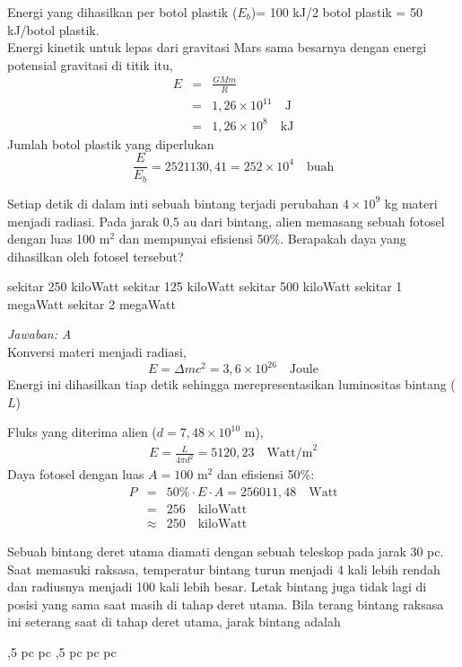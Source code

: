 \documentclass[11pt,fleqn, a4paper]{exam}
\begin{document}
\begin{questions}
Energi yang dihasilkan per botol plastik ($E_b$)= 100 kJ/2 botol plastik =  50 kJ/botol plastik.\\
Energi kinetik untuk lepas dari gravitasi Mars sama besarnya dengan energi potensial gravitasi di titik itu,
\begin{eqnarray*}
E &=& \frac{GMm}{R}\\
  &=& 1,26\times 10^{11} \quad \text{J}\\
  &=& 1,26\times 10^8 \quad \text{kJ}
\end{eqnarray*}
Jumlah botol plastik yang diperlukan 
\begin{equation*}
\frac{E}{E_b} = 2521130,41 = 252\times 10^4 \quad \text{buah}
\end{equation*}


\vspace{0.5cm}
\question Setiap detik di dalam inti sebuah bintang terjadi perubahan $4\times 10^9$ kg materi menjadi radiasi. Pada jarak 0,5 au dari bintang, alien memasang sebuah fotosel dengan luas 100 m$^2$ dan mempunyai efisiensi 50\%. Berapakah daya yang dihasilkan oleh fotosel tersebut?
\begin{choices}
\choice sekitar 250 kiloWatt
\choice sekitar 125 kiloWatt
\choice sekitar 500 kiloWatt
\choice sekitar 1 megaWatt
\choice sekitar 2 megaWatt
\end{choices}

\textit{Jawaban: A}\\
Konversi materi menjadi radiasi,
\begin{equation*}
E = \Delta mc^2 = 3,6\times 10^{26} \quad \text{Joule}
\end{equation*}
Energi ini dihasilkan tiap detik sehingga merepresentasikan luminositas bintang ($L$)

Fluks yang diterima alien ($d = 7,48\times 10^{10}$ m),
\begin{eqnarray*}
E=\frac{L}{4\pi d^2} = 5120,23\quad \text{Watt/m}^2
\end{eqnarray*}
Daya fotosel dengan luas $A=100$ m$^2$ dan efisiensi 50\%: 
\begin{eqnarray*}
P &=& 50\% \cdot E \cdot A = 256011,48 \quad \text{Watt} \\
  &=& 256 \quad \text{kiloWatt} \\
  &\approx& 250 \quad \text{kiloWatt}
\end{eqnarray*}

\vspace{0.5cm}
\question Sebuah bintang deret utama diamati dengan sebuah teleskop pada jarak 30 pc. Saat memasuki   raksasa, temperatur bintang turun menjadi 4 kali lebih rendah dan radiusnya menjadi 100 kali lebih besar. Letak bintang juga tidak lagi di posisi yang sama saat masih di tahap deret utama. Bila terang bintang raksasa ini seterang saat di tahap deret utama, jarak bintang adalah
\begin{choices}
,5 pc
 pc
,5 pc
 pc
 pc
\end{choices}


\end{questions}
\end{document}

